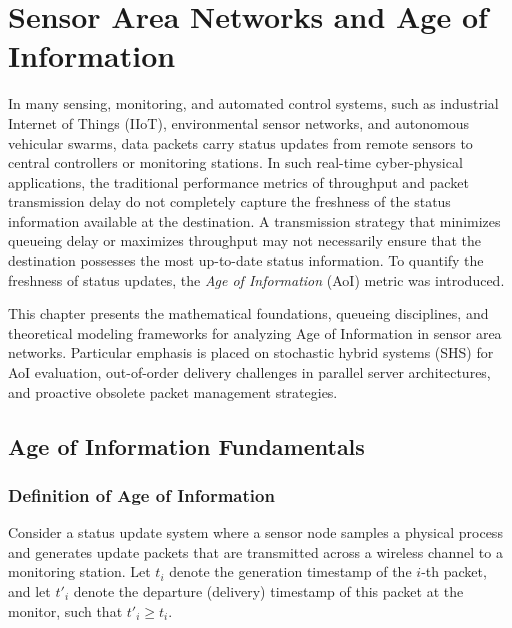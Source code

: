 \chapter{Sensor Area Networks and Age of Information}
\label{sec:chapter_aoi}

In many sensing, monitoring, and automated control systems, such as industrial Internet of Things (IIoT), environmental sensor networks, and autonomous vehicular swarms, data packets carry status updates from remote sensors to central controllers or monitoring stations. In such real-time cyber-physical applications, the traditional performance metrics of throughput and packet transmission delay do not completely capture the freshness of the status information available at the destination. A transmission strategy that minimizes queueing delay or maximizes throughput may not necessarily ensure that the destination possesses the most up-to-date status information. To quantify the freshness of status updates, the \emph{Age of Information} (AoI) metric was introduced.

This chapter presents the mathematical foundations, queueing disciplines, and theoretical modeling frameworks for analyzing Age of Information in sensor area networks. Particular emphasis is placed on stochastic hybrid systems (SHS) for AoI evaluation, out-of-order delivery challenges in parallel server architectures, and proactive obsolete packet management strategies.

\section{Age of Information Fundamentals}
\label{sec:aoi_fundamentals}

\subsection{Definition of Age of Information}
Consider a status update system where a sensor node samples a physical process and generates update packets that are transmitted across a wireless channel to a monitoring station. Let $t_i$ denote the generation timestamp of the $i$-th packet, and let $t'_i$ denote the departure (delivery) timestamp of this packet at the monitor, such that $t'_i \ge t_i$.

